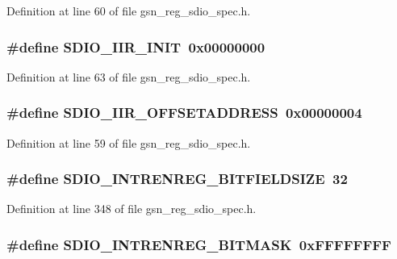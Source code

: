 Definition at line 60 of file gsn\_\-reg\_\-sdio\_\-spec.h.

\hypertarget{a00571_a666f39222dcd522ed63dfb38a806b8a1}{
\subsubsection[{SDIO\_\-IIR\_\-INIT}]{\setlength{\rightskip}{0pt plus 5cm}\#define SDIO\_\-IIR\_\-INIT~0x00000000}}
\label{a00571_a666f39222dcd522ed63dfb38a806b8a1}


Definition at line 63 of file gsn\_\-reg\_\-sdio\_\-spec.h.

\hypertarget{a00571_abb22a967669ed49c87ecbb70f93e020a}{
\subsubsection[{SDIO\_\-IIR\_\-OFFSETADDRESS}]{\setlength{\rightskip}{0pt plus 5cm}\#define SDIO\_\-IIR\_\-OFFSETADDRESS~0x00000004}}
\label{a00571_abb22a967669ed49c87ecbb70f93e020a}


Definition at line 59 of file gsn\_\-reg\_\-sdio\_\-spec.h.

\hypertarget{a00571_a96fda0197bef1021ca326474436a92ce}{
\subsubsection[{SDIO\_\-INTRENREG\_\-BITFIELDSIZE}]{\setlength{\rightskip}{0pt plus 5cm}\#define SDIO\_\-INTRENREG\_\-BITFIELDSIZE~32}}
\label{a00571_a96fda0197bef1021ca326474436a92ce}


Definition at line 348 of file gsn\_\-reg\_\-sdio\_\-spec.h.

\hypertarget{a00571_ad2ffe4a1e1b4c88fd2c5e81066b67c7b}{
\subsubsection[{SDIO\_\-INTRENREG\_\-BITMASK}]{\setlength{\rightskip}{0pt plus 5cm}\#define SDIO\_\-INTRENREG\_\-BITMASK~0xFFFFFFFF}}
\label{a00571_ad2ffe4a1e1b4c88fd2c5e81066b67c7b}


